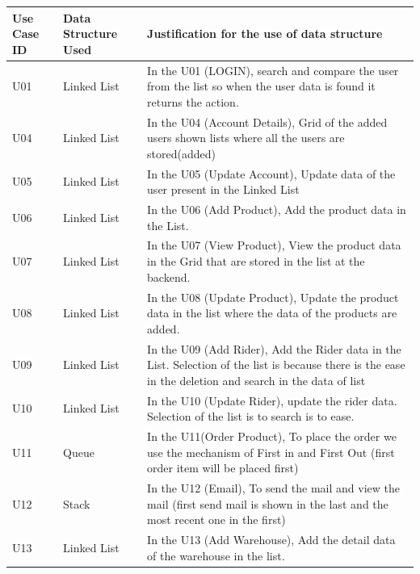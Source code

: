 \documentclass[12pt,a4paper]{report}
\begin{document}
\begin{tabular}{ | m{2cm} | m{3cm}|m{9cm}| } \hline
\textbf{ Use Case ID}&	\textbf{Data Structure Used}	& \textbf{Justification for the use of data structure}  \\ \hline
U01 &Linked List& In the U01 (LOGIN), search and compare the user from the list so when the user data is found it returns the action.\\ \hline
U04 &Linked List& In the U04 (Account Details), Grid of the added users shown lists where all the users are stored(added) \\ \hline
U05 &Linked List& In the U05 (Update Account), Update data of  the user present in the Linked List\\ \hline
U06 &Linked List&In the U06 (Add Product), Add the product data in the List. \\ \hline
U07 &Linked List&In the U07 (View Product), View the product data in the Grid that are stored in the list at the backend. \\ \hline
U08 &Linked List& In the U08 (Update Product), Update the product data in the list where the data of the products are added.\\ \hline
U09 &Linked List& In the U09 (Add Rider), Add the Rider data in the List. Selection of the list is because there is the ease in the deletion and search in the data of list\\ \hline
U10 &Linked List&In the U10 (Update Rider), update the rider data. Selection of the list is to search is to ease. \\ \hline
U11 &Queue      & In the U11(Order Product), To place the order we use the mechanism of First in and First Out (first order item will be placed first)\\ \hline
U12 &Stack      & In the U12 (Email), To send the mail and view the mail (first send mail is shown in the last and the most recent one in the first)\\ \hline
U13 &Linked List& In the U13 (Add Warehouse), Add the detail data of the warehouse in the list.\\ \hline
\end{tabular}
\end{document}
